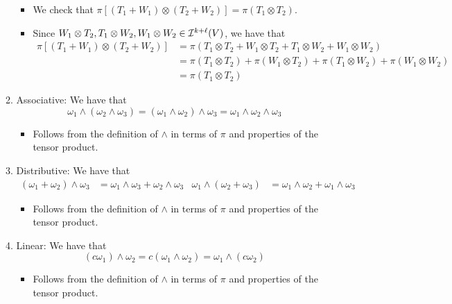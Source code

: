 \documentclass[../notes.tex]{subfiles}
\begin{document}
\begin{itemize}
\begin{enumerate}
\begin{itemize}
            \item We check that $\pi[(T_1+W_1)\otimes(T_2+W_2)]=\pi(T_1\otimes T_2)$.
            \item Since $W_1\otimes T_2,T_1\otimes W_2,W_1\otimes W_2\in\ide[k+\ell]{V}$, we have that
            \begin{align*}
                \pi[(T_1+W_1)\otimes(T_2+W_2)] &= \pi(T_1\otimes T_2+W_1\otimes T_2+T_1\otimes W_2+W_1\otimes W_2)\\
                &= \pi(T_1\otimes T_2)+\pi(W_1\otimes T_2)+\pi(T_1\otimes W_2)+\pi(W_1\otimes W_2)\\
                &= \pi(T_1\otimes T_2)
            \end{align*}
        \end{itemize}
        \item Associative: We have that
        \begin{equation*}
            \omega_1\wedge(\omega_2\wedge\omega_3)=(\omega_1\wedge\omega_2)\wedge\omega_3=\omega_1\wedge\omega_2\wedge\omega_3
        \end{equation*}
        \begin{itemize}
            \item Follows from the definition of $\wedge$ in terms of $\pi$ and properties of the tensor product.
        \end{itemize}
        \item Distributive: We have that
        \begin{align*}
            (\omega_1+\omega_2)\wedge\omega_3 &= \omega_1\wedge\omega_3+\omega_2\wedge\omega_3&
            \omega_1\wedge(\omega_2+\omega_3) &= \omega_1\wedge\omega_2+\omega_1\wedge\omega_3
        \end{align*}
        \begin{itemize}
            \item Follows from the definition of $\wedge$ in terms of $\pi$ and properties of the tensor product.
        \end{itemize}
        \item Linear: We have that
        \begin{equation*}
            (c\omega_1)\wedge\omega_2 = c(\omega_1\wedge\omega_2)
            = \omega_1\wedge(c\omega_2)
        \end{equation*}
        \begin{itemize}
            \item Follows from the definition of $\wedge$ in terms of $\pi$ and properties of the tensor product.

\end{itemize}
\end{enumerate}
\end{itemize}
\end{document}
